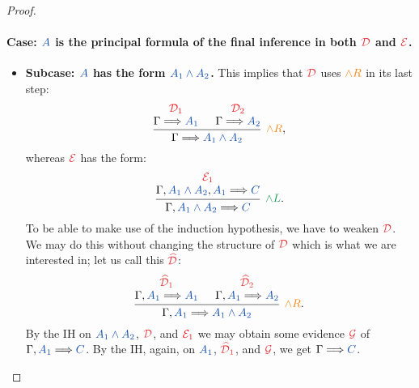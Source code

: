 \begin{proof}
  \paragraph{Case: $\prp{A}$ is the principal formula of the final inference
  in both $\drv{D}$ and $\drv{E}$.}
  \begin{itemize}
    \item \textbf{Subcase: $\prp{A}$ has the form $\prp{A_1 \land A_2}$.}
    This implies that $\drv{D}$ uses $\rightRule{\land R}$ in its last step:
    \[
      \begin{prooftree}
        \hypo{{\color{Red} \mathcal{D}_1}}
        \infer[no rule]1{\sequent{A_1}}
        \hypo{{\color{Red} \mathcal{D}_2}}
        \infer[no rule]1{\sequent{A_2}}
        \infer2[$\rightRule{\land R}$,]{\sequent{A_1 \land A_2}}
      \end{prooftree}
    \]
    whereas $\drv{E}$ has the form:
    \[
      \begin{prooftree}
        \hypo{{\color{Red} \mathcal{E}_1}}
        \infer[no rule]1{\sequent[A_1 \land A_2][A_1]{C}}
        \infer1[$\leftRule{\land L}$.]{\sequent[A_1 \land A_2]{C}}
      \end{prooftree}
    \]
    To be able to make use of the induction hypothesis, we have to weaken
    $\drv{D}$. We may do this without changing the structure of $\drv{D}$ which
    is what we are interested in; let us call this $\drv{\widehat{D}}$:
    \[
      \begin{prooftree}
        \hypo{\drv{\widehat{D}}[1]}
        \infer[no rule]1{\sequent[A_1]{A_1}}
        \hypo{\drv{\widehat{D}}[2]}
        \infer[no rule]1{\sequent[A_1]{A_2}}
        \infer2[$\rightRule{\land R}$.]{\sequent[A_1]{A_1 \land A_2}}
      \end{prooftree}
    \]
    By the IH on $\prp{A_1 \land A_2}$, $\drv{D}$, and
    ${\color{Red} \mathcal{E}_1}$ we may obtain some evidence $\drv{G}$
    of $\sequent[A_1]{C}$. By the IH, again, on $\prp{A_1}$,
    $\drv{\widehat{D}}[1]$, and $\drv{G}$, we get $\sequent{C}$.


\end{itemize}
\end{proof}
